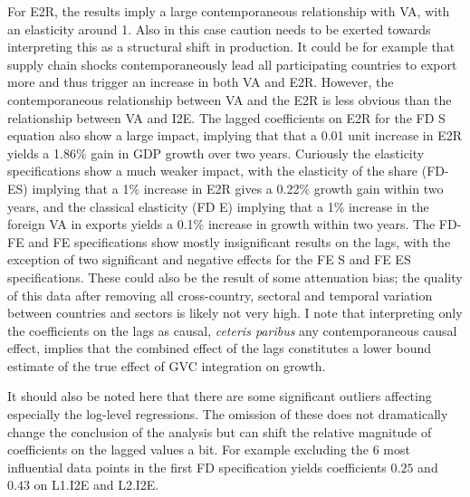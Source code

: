 \documentclass[a4paper]{article}
\begin{document}
For E2R, the results imply a large contemporaneous relationship with VA, with an elasticity around 1. Also in this case caution needs to be exerted towards interpreting this as a structural shift in production. It could be for example that supply chain shocks contemporaneously lead all participating countries to export more and thus trigger an increase in both VA and E2R. However, the contemporaneous relationship between VA and the E2R is less obvious than the relationship between VA and I2E. The lagged coefficients on E2R for the FD S equation also show a large impact, implying that that a 0.01 unit increase in E2R yields a 1.86\% gain in GDP growth over two years. Curiously the elasticity specifications show a much weaker impact, with the elasticity of the share (FD-ES) implying that a 1\% increase in E2R gives a 0.22\% growth gain within two years, and the classical elasticity (FD E) implying that a 1\% increase in the foreign VA in exports yields a 0.1\% increase in growth within two years. The FD-FE and FE specifications show mostly insignificant results on the lags, with the exception of two significant and negative effects for the FE S and FE ES specifications. These could also be the result of some attenuation bias; the quality of this data after removing all cross-country, sectoral and temporal variation between countries and sectors is likely not very high.  I note that interpreting only the coefficients on the lags as causal, \textit{ceteris paribus} any contemporaneous causal effect, implies that the combined effect of the lags constitutes a lower bound estimate of the true effect of GVC integration on growth.  %

It should also be noted here that there are some significant outliers affecting especially the log-level regressions. The omission of these does not dramatically change the conclusion of the analysis but can shift the relative magnitude of coefficients on the lagged values a bit. For example excluding the 6 most influential data points in the first FD specification yields coefficients $0.25$ and $0.43$ on L1.I2E and L2.I2E. \newline 
\end{document}
